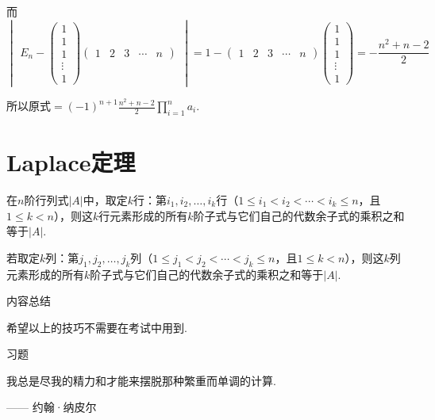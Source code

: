 \begin{solution}
    而 \[ \begin{vmatrix}E_n-\begin{pmatrix}
                1 \\1\\1\\\vdots\\1
            \end{pmatrix}\begin{pmatrix}1 & 2 & 3 & \cdots & n\end{pmatrix}\end{vmatrix}
        =1-\begin{pmatrix}1 & 2 & 3 & \cdots & n\end{pmatrix}
        \begin{pmatrix}1 \\ 1 \\ 1 \\ \vdots \\ 1\end{pmatrix}
        =-\frac{n^2+n-2}{2} \]

    所以原式$\displaystyle =(-1)^{n+1}\frac{n^2+n-2}{2}\prod_{i=1}^na_i$.
\end{solution}

\section{Laplace定理}
\begin{theorem}\label{thm:14:Laplace定理}
    在$n$阶行列式$|A|$中，取定$k$行：第$i_1,i_2,\ldots,i_k$行（$1\leqslant i_1<i_2<\cdots<i_k\leqslant n$，且$1\leqslant k<n$），则这$k$行元素形成的所有$k$阶子式与它们自己的代数余子式的乘积之和等于$|A|$.

    若取定$k$列：第$j_1,j_2,\ldots,j_k$列（$1\leqslant j_1<j_2<\cdots<j_k\leqslant n$，且$1\leqslant k<n$），则这$k$列元素形成的所有$k$阶子式与它们自己的代数余子式的乘积之和等于$|A|$.
\end{theorem}
\vspace{2ex}
\centerline{\heiti \Large 内容总结}

希望以上的技巧不需要在考试中用到.

\vspace{2ex}
\centerline{\heiti \Large 习题}

\vspace{2ex}
{\kaishu 我总是尽我的精力和才能来摆脱那种繁重而单调的计算. }
\begin{flushright}
    \kaishu
    —— 约翰·纳皮尔
\end{flushright}

